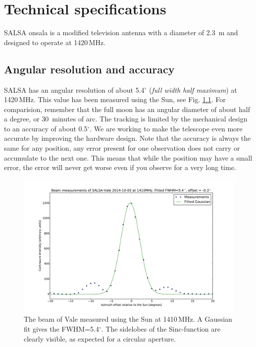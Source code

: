 \chapter{Technical specifications}
\label{chap:tech}
SALSA onsala is a modified television antenna with a diameter of 2.3~m and designed
to operate at 1420\,MHz.

\section{Angular resolution and accuracy}
\label{sect:ares}
SALSA has an angular resolution of about 5.4$^\circ$ (\emph{full width half
maximum}) at 1420\,MHz. This value has been measured using the Sun, see Fig.
\ref{fig:beam}. For comparision, remember that the full moon has an angular
diameter of about half a degree, or 30~minutes of arc. The tracking is limited
by the mechanical design to an accuracy of about 0.5$^\circ$.  We are working
to make the telescope even more accurate by improving the hardware design. Note
that the accuracy is always the same for any position, any error present for
one observation does not carry or accumulate to the next one.  This means that
while the position may have a small error, the error will never get worse even
if you observe for a very long time. 
\begin{figure}[ht]
\begin{center}
\includegraphics[width=\textwidth]{../figures/Beam_vale_2014-10-03.pdf}
\end{center}
\caption{The beam of Vale measured using the Sun at 1410\,MHz. A Gaussian fit
gives the FWHM=5.4$^\circ$. The sidelobes of the Sinc-function are clearly
visible, as expected for a circular aperture.}
\label{fig:beam}
\end{figure}

